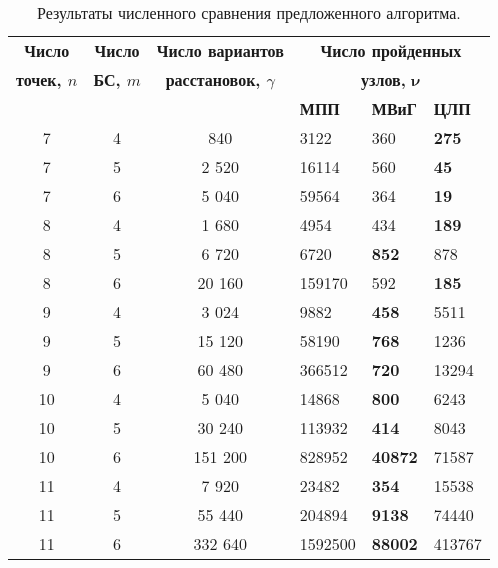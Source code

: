   \begin{table}
    \caption{Результаты численного сравнения предложенного алгоритма.}\label{tab:synopsis_models_comparation}
    \begin{tabular}{|c|c|c|*{3}{l}|} \cline{3-6}
    \hline
     \textbf{Число} & \textbf{Число} &\textbf{Число вариантов} & \multicolumn{3}{c|}{\textbf{Число пройденных}}\\ 

    \textbf{точек, $n$} & \textbf{БС, $m$} &\textbf{расстановок, $\gamma$} & \multicolumn{3}{c|}{\textbf{узлов,} $\mathbf{\nu}$}\\ 
    \cline{4-6}
     &  & & \textbf{МПП}& \textbf{МВиГ} & \textbf{ЦЛП} \\ 
    \hline
    7 &     4 & 840     & 3122 & 360 &  \textbf{275} \\
    7 &     5 & 2 520   & 16114 & 560  &  \textbf{45}  \\
    7 &     6 & 5 040   & 59564 & 364  &  \textbf{19}  \\
    8 &     4 & 1 680   & 4954 &  434 &   \textbf{189} \\
    8 &     5 & 6 720   & 6720 & \textbf{852}  &  878 \\
    8 &     6 & 20 160  & 159170 & 592  & \textbf{185}  \\
    9  &    4 & 3 024   & 9882 & \textbf{458} & 5511 \\
    9  &    5 & 15 120  & 58190 &  \textbf{768} &  1236\\
    9  &    6 & 60 480  & 366512 &  \textbf{720} & 13294 \\
    10 &    4 & 5 040   & 14868&  \textbf{800}&  6243\\
    10 &    5 & 30 240  & 113932&  \textbf{414}&  8043\\
    10 &	6 & 151 200 & 828952&  \textbf{40872}&  71587\\
    11 &    4 & 7 920   & 23482&  \textbf{354} & 15538\\
    11 &	5 & 55 440  & 204894& \textbf{9138}&  74440\\
    11 &	6 & 332 640 & 1592500 & \textbf{88002} & 413767 \\
    \hline
    \end{tabular}
  \end{table} 
  \normalsize



